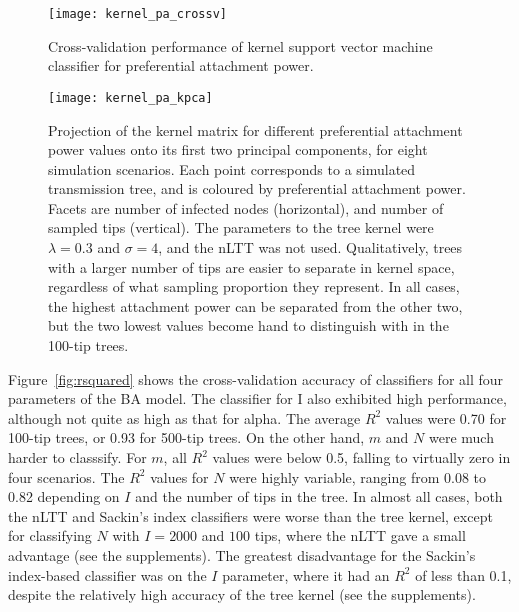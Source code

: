 \begin{figure}[ht]
  \centering
  \label{fig:pacrossv}
  \texttt{[image: kernel\_pa\_crossv]}
  \caption[Cross-validation performance of kernel support vector machine
  classifier for preferential attachment power]{
    Cross-validation performance of kernel support vector machine classifier
    for preferential attachment power.
  }
\end{figure}

\begin{figure}[ht]
  \centering
  \label{fig:pakpca}
  \texttt{[image: kernel\_pa\_kpca]}
  \caption[Projection of kernel matrix for different attachment power values
  onto its first two principal components]{
    Projection of the kernel matrix for different preferential attachment power
    values onto its first two principal components, for eight simulation
    scenarios. Each point corresponds to a simulated transmission tree, and is
    coloured by preferential attachment power. Facets are number of infected
    nodes (horizontal), and number of sampled tips (vertical). The parameters
    to the tree kernel were $\lambda = 0.3$ and $\sigma = 4$, and the nLTT was
    not used. Qualitatively, trees with a larger number of tips are easier to
    separate in kernel space, regardless of what sampling proportion they
    represent. In all cases, the highest attachment power can be separated from
    the other two, but the two lowest values become hand to distinguish with in
    the 100-tip trees.
  }
\end{figure}

Figure~\ref{fig:rsquared} shows the cross-validation accuracy of classifiers
for all four parameters of the \gls{BA} model. The classifier for \gls{I} also
exhibited high performance, although not quite as high as that for \gls{alpha}.
The average $R^2$ values were 0.70 for 100-tip trees, or 0.93 for 500-tip
trees. On the other hand, $m$ and $N$ were much harder to classsify. For $m$,
all $R^2$ values were below 0.5, falling to virtually zero in four scenarios.
The $R^2$ values for $N$ were highly variable, ranging from 0.08 to 0.82
depending on $I$ and the number of tips in the tree. In almost all cases, both
the nLTT and Sackin's index classifiers were worse than the tree kernel, except
for classifying $N$ with $I = 2000$ and $100$ tips, where the nLTT gave a small
advantage (see the supplements). The greatest disadvantage for the Sackin's
index-based classifier was on the $I$ parameter, where it had an $R^2$ of less
than 0.1, despite the relatively high accuracy of the tree kernel (see the
supplements).

